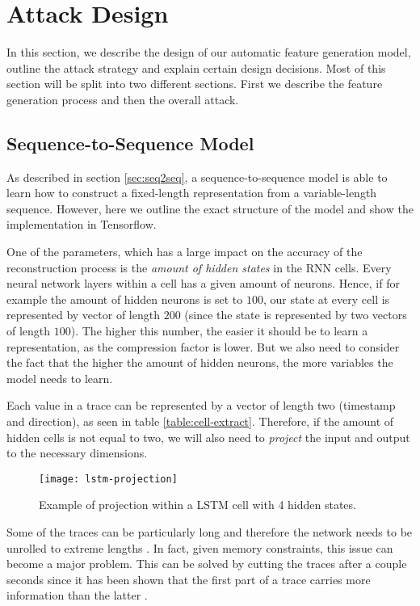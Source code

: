 \chapter{Attack Design}

In this section, we describe the design of our automatic feature generation model, outline the attack strategy and explain certain design decisions.
Most of this section will be split into two different sections.
First we describe the feature generation process and then the overall attack.

\section{Sequence-to-Sequence Model}

As described in section \ref{sec:seq2seq}, a sequence-to-sequence model is able to learn how to construct a fixed-length representation from a variable-length sequence.
However, here we outline the exact structure of the model and show the implementation in Tensorflow.

One of the parameters, which has a large impact on the accuracy of the reconstruction process is the \textit{amount of hidden states} in the RNN cells.
Every neural network layers within a cell has a given amount of neurons.
Hence, if for example the amount of hidden neurons is set to $100$, our state at every cell is represented by vector of length $200$ (since the state is represented by two vectors of length $100$).
The higher this number, the easier it should be to learn a representation, as the compression factor is lower.
But we also need to consider the fact that the higher the amount of hidden neurons, the more variables the model needs to learn.

Each value in a trace can be represented by a vector of length two (timestamp and direction), as seen in table \ref{table:cell-extract}.
Therefore, if the amount of hidden cells is not equal to two, we will also need to \textit{project} the input and output to the necessary dimensions.

\begin{figure}[ht]
  \centering
  \texttt{[image: lstm-projection]}
  \caption{Example of projection within a LSTM cell with 4 hidden states.}
  \label{fig:lstm-projection}
\end{figure}

Some of the traces can be particularly long and therefore the network needs to be unrolled to extreme lengths \cite{greschbach2016effect}.
In fact, given memory constraints, this issue can become a major problem.
This can be solved by cutting the traces after a couple seconds since it has been shown that the first part of a trace carries more information than the latter \cite{TODO: Include}.

